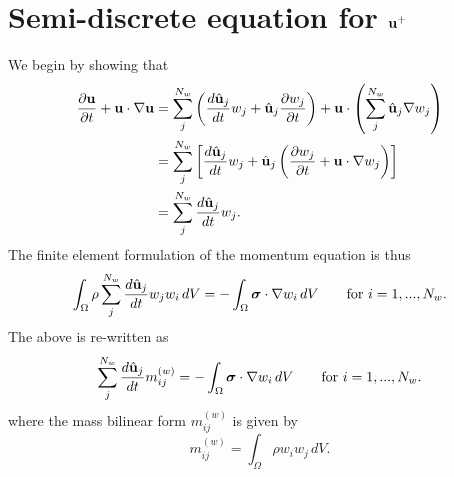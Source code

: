 \documentclass[11pt]{article}
\begin{document}
\section{Semi-discrete equation for $\mathbf{u}^+$}
We begin by showing that
\begin{align}
    \frac{\partial \mathbf{u}}{\partial t} + \mathbf{u} \cdot \nabla \mathbf{u} &= \sum_j^{N_w} \left ( \frac{d \hat{\mathbf{u}}_j}{d t} w_j + \hat{\mathbf{u}}_j \frac{\partial w_j}{\partial t} \right ) + \mathbf{u} \cdot \left ( \sum_j^{N_w} \hat{\mathbf{u}}_j \nabla w_j \right ) \nonumber \\
    &= \sum_j^{N_w} \left [ \frac{d \hat{\mathbf{u}}_j}{d t} w_j + \hat{\mathbf{u}}_j \left ( \frac{\partial w_j}{\partial t} + \mathbf{u} \cdot \nabla w_j \right ) \right ] \nonumber \\
    &= \sum_j^{N_w} \frac{d \hat{\mathbf{u}}_j}{d t} w_j.
\end{align}
The finite element formulation of the momentum equation is thus 
\begin{equation}
    \int_\Omega \rho \sum_j^{N_w} \frac{d \hat{\mathbf{u}}_j}{d t} w_j w_i \, dV = -\int_\Omega \bm \sigma \cdot \nabla w_i \, dV \qquad \text{for } i = 1,...,N_w.
\end{equation}
The above is re-written as
\begin{equation}
    \label{eq:semi_discrete_momentum_bilinear}
    \sum_j^{N_w} \frac{d \hat{\mathbf{u}}_j}{d t} m^{(w)}_{ij} = -\int_\Omega \bm \sigma \cdot \nabla w_i \, dV \qquad \text{for } i = 1,...,N_w.
\end{equation}
where the mass bilinear form $m^{(w)}_{ij}$ is given by 
\begin{equation}
    m^{(w)}_{ij} = \int_\Omega \rho w_i w_j \, dV.
\end{equation}
\end{document}
